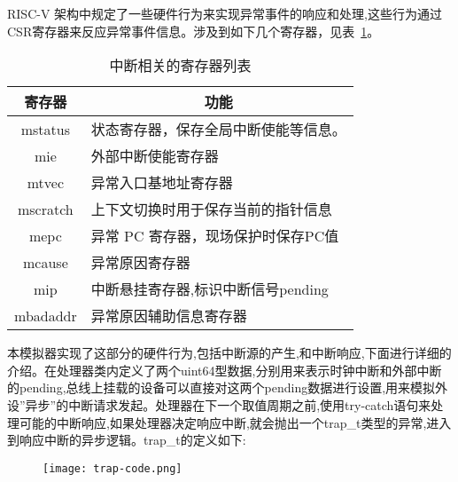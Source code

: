 RISC-V 架构中规定了一些硬件行为来实现异常事件的响应和处理,这些行为通过CSR寄存器来反应异常事件信息。涉及到如下几个寄存器，见表~\ref{tab:csr}。
\begin{table}[H]
  \centering
  \caption{中断相关的寄存器列表}
  \label{tab:csr}
  \renewcommand\arraystretch{1.2}
  \begin{tabular}{cl}
    \toprule
寄存器	& \multicolumn{1}{c}{功能}\\
    \midrule
    mstatus	& \multicolumn{1}{m{7cm}}{状态寄存器，保存全局中断使能等信息。}\\ \hline
    mie	& \multicolumn{1}{m{7cm}}{外部中断使能寄存器}\\ \hline
    mtvec	& \multicolumn{1}{m{7cm}}{异常入口基地址寄存器}\\ \hline
    mscratch & \multicolumn{1}{m{7cm}}{上下文切换时用于保存当前的指针信息}\\ \hline
    mepc & \multicolumn{1}{m{7cm}}{异常 PC 寄存器，现场保护时保存PC值}\\ \hline
    mcause & \multicolumn{1}{m{7cm}}{异常原因寄存器}\\ \hline
    mip	& \multicolumn{1}{m{7cm}}{中断悬挂寄存器,标识中断信号pending}\\ \hline
    mbadaddr & \multicolumn{1}{m{7cm}}{异常原因辅助信息寄存器}\\
    \bottomrule
  \end{tabular}
\end{table}

本模拟器实现了这部分的硬件行为,包括中断源的产生,和中断响应,下面进行详细的介绍。在处理器类内定义了两个uint64型数据,分别用来表示时钟中断和外部中断的pending,总线上挂载的设备可以直接对这两个pending数据进行设置,用来模拟外设”异步”的中断请求发起。处理器在下一个取值周期之前,使用try-catch语句来处理可能的中断响应,如果处理器决定响应中断,就会抛出一个trap\_t类型的异常,进入到响应中断的异步逻辑。trap\_t的定义如下:
\begin{figure}[H]
    \centering
    \texttt{[image: trap-code.png]}
    \label{fig:trap-code}
\end{figure}
\vspace{-0.8cm} 

